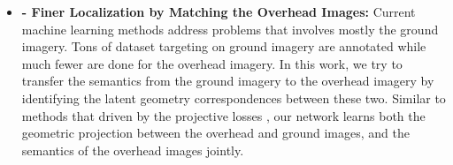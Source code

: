 \begin{itemize}[noitemsep]
  \item \textbf{ -
  Finer Localization by Matching the Overhead Images:} \newline \newline
  Current machine learning methods address problems that involves mostly
  the ground imagery. Tons of dataset targeting on ground imagery are
  annotated while much fewer are done for the overhead imagery.
  In this work, we try to transfer the semantics from the ground imagery
  to the overhead imagery by identifying the latent geometry
  correspondences between these two. Similar to methods that driven by
  the projective losses , our network learns 
  both the geometric projection between the overhead and ground
  images, and the semantics of the overhead images jointly. \newline


\end{itemize}
